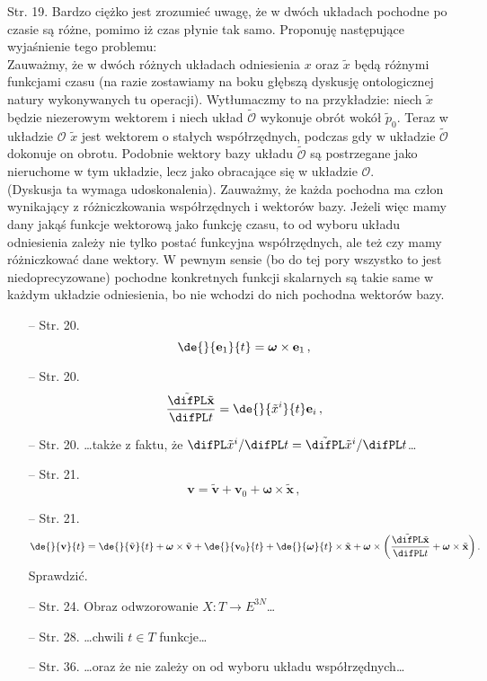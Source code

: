 \documentclass[a4paper,11pt]{article}
\begin{document}
\start {}

\start Str. 19. Bardzo ciężko jest zrozumieć uwagę, że w dwóch układach pochodne po czasie są różne, pomimo iż czas płynie tak samo. Proponuję następujące wyjaśnienie tego problemu: \\
Zauważmy, że w dwóch różnych układach odniesienia $x$ oraz
$\tilde{ x }$ będą różnymi funkcjami czasu (na razie zostawiamy na
boku głębszą dyskusję ontologicznej natury wykonywanych tu operacji).
Wytłumaczmy to na przykładzie: niech $\tilde{ x }$ będzie niezerowym
wektorem i niech układ $\tilde{ \mathcal{ O } }$ wykonuje obrót wokół
$\tilde{ p }_{ 0 }$. Teraz w układzie $\mathcal{ O }$ $\tilde{ x }$
jest wektorem o stałych współrzędnych, podczas gdy w układzie
$\tilde{ \mathcal{ O } }$ dokonuje on obrotu. Podobnie wektory bazy
układu $\tilde{ \mathcal{ O } }$ są postrzegane jako nieruchome w tym
układzie, lecz jako obracające się w
układzie $\mathcal{ O }$. \\
(Dyskusja ta wymaga udoskonalenia). Zauważmy, że każda pochodna ma
człon wynikający z różniczkowania współrzędnych i wektorów bazy.
Jeżeli więc mamy dany jakąś funkcje wektorową jako funkcję czasu, to
od wyboru układu odniesienia zależy nie tylko postać funkcyjna
współrzędnych, ale też czy mamy różniczkować dane wektory. W pewnym
sensie (bo do tej pory wszystko to jest niedoprecyzowane) pochodne
konkretnych funkcji skalarnych są takie same w każdym układzie
odniesienia, bo nie wchodzi do nich pochodna wektorów bazy.



\begin{itemize}
\item[--] Str. 20.
  $$\de{}{ \mathbf{ e }_{ 1 } }{ t } = \boldsymbol{ \omega } \times
  \bold{ e }_{ 1 } \, ,$$
\item[--] Str. 20.
  $$\frac{ \tilde{ \difPL } \tilde{ \mathbf{ x } } }{ \difPL t } = \de{}{
    \tilde{ x }^{ i }}{ t } \mathbf{ e }_{ i } \, ,$$
\item[--] Str. 20. \ldots także z faktu, że
  $\difPL \tilde{ x }^{ i } / \difPL t = \tilde{ \difPL } \tilde{ x }^{ i }
  / \difPL t$\ldots
\item[--] Str. 21.
  $$\mathbf{ v } = \tilde{ \mathbf{ v } } + \mathbf{ v }_{ 0 } +
  \boldsymbol{ \omega } \times \tilde{ \mathbf{ x } } \, ,$$
\item[--] Str. 21.
  $$\de{}{ \mathbf{ v } }{ t } = \de{}{ \tilde{ \mathbf{ v } } }{ t }
  + \boldsymbol{ \omega } \times \tilde{ \mathbf{ v } } + \de{}{ \mathbf{ v }_{
      0 } }{ t } + \de{}{ \boldsymbol{ \omega } }{ t } \times \tilde{
    \bold{ x } } + \boldsymbol{ \omega } \times \bigg( \frac{ \tilde{
      \difPL } \tilde{ \bold{ x } } }{ \difPL t } + \boldsymbol{ \omega }
  \times \tilde{ \bold{ x } } \bigg) \, .$$ Sprawdzić.
\item[--] Str. 24. Obraz odwzorowanie $X : T \rightarrow E^{ 3N }$\ldots
\item[--] Str. 28. \ldots chwili $t \in T$ funkcje\ldots
\item[--] Str. 36. \ldots oraz że nie zależy on od wyboru układu
  współrzędnych\ldots
\end{itemize}
\end{document}
